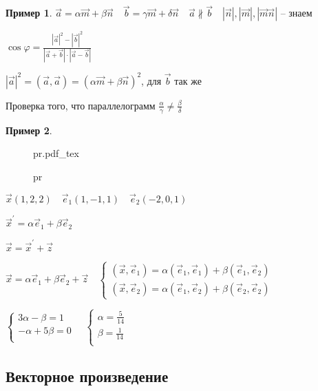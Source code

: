 \documentclass{book}
\newcommand{\p}[1]{#1^{\prime}}
\theoremstyle{definition}
\newtheorem*{example}{Пример}
\newcommand{\incfig}[1]{%
    \def\svgwidth{\columnwidth}
    {#1.pdf_tex}
}
\begin{document}
\begin{example}
    $\vec a = \alpha \vec m + \beta \vec n\quad \vec b = \gamma \vec m + \delta \vec n\quad \vec a \not\parallel \vec b\quad \left| \vec n \right|,\left| \vec m \right| , \left| \vec m \vec n \right| $ -- знаем

    $\cos\varphi = \frac{\left| \vec a \right| ^2 - \left| \vec b \right| ^2}{\left| \vec a + \vec b \right| \cdot \left| \vec a - \vec b \right| }$ 

    $\left| \vec a \right| ^2 = (\vec a, \vec a) = \left( \alpha \vec m + \beta \vec n \right) ^2$, для $\vec b$ так же

    Проверка того, что параллелограмм $\frac{\alpha}{\gamma} \neq \frac{\beta}{\delta}$ 


\end{example}
 \begin{example}
\begin{figure}[ht]
    \centering
    \incfig{pr}
    \caption{pr}
    \label{fig:pr}
\end{figure}

$\vec x(1, 2, 2)\quad \vec e_1(1, -1, 1)\quad \vec e_2(-2, 0, 1)$

$\p {\vec x} = \alpha \vec e_1 + \beta \vec e_2$

$\vec x = \p {\vec x} + \vec z$

$\vec x = \alpha \vec e_1 + \beta \vec e_2 + \vec z\quad \begin{cases}
   (\vec x, \vec e_1) = \alpha(\vec e_1, \vec e_1) + \beta (\vec e_1, \vec e_2)\\
   (\vec x, \vec e_2) = \alpha (\vec e_1, \vec e_2) + \beta (\vec e_2, \vec e_2)
\end{cases} $

$\begin{cases}
    3\alpha-\beta =1\\
    -\alpha+5\beta = 0\\
\end{cases}
\quad \begin{cases}
    \alpha = \frac{5}{14}\\
    \beta = \frac{1}{14}\\
\end{cases}$
 \end{example}

 \subsection{Векторное произведение}
\end{document}
